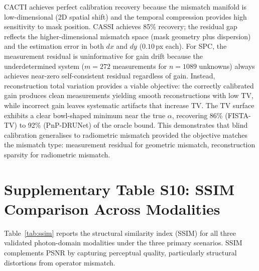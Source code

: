 \documentclass[11pt]{article}
\theoremstyle{definition}
\begin{document}
\noindent CACTI achieves perfect calibration recovery because the mismatch
manifold is low-dimensional (2D spatial shift) and the temporal compression
provides high sensitivity to mask position.  CASSI achieves 85\% recovery;
the residual gap reflects the higher-dimensional mismatch space (mask
geometry plus dispersion) and the estimation error in both $dx$ and $dy$
($0.10$\,px each).  For SPC, the measurement residual is uninformative
for gain drift because the underdetermined system ($m{=}272$ measurements
for $n{=}1089$ unknowns) always achieves near-zero self-consistent residual
regardless of gain.  Instead, reconstruction total variation provides a
viable objective: the correctly calibrated gain produces clean measurements
yielding smooth reconstructions with low TV, while incorrect gain leaves
systematic artifacts that increase TV.  The TV surface exhibits a clear
bowl-shaped minimum near the true $\alpha$, recovering 86\% (FISTA-TV) to
92\% (PnP-DRUNet) of the oracle bound.  This demonstrates that blind
calibration generalises to radiometric mismatch provided the objective
matches the mismatch type: measurement residual for geometric mismatch,
reconstruction sparsity for radiometric mismatch.


\newpage
\section{Supplementary Table S10: SSIM Comparison Across Modalities}
\label{sec:ssim}

Table~\ref{tab:ssim} reports the structural similarity index (SSIM)
for all three validated photon-domain modalities under the three
primary scenarios. SSIM complements PSNR by capturing perceptual
quality, particularly structural distortions from operator mismatch.
\end{document}
